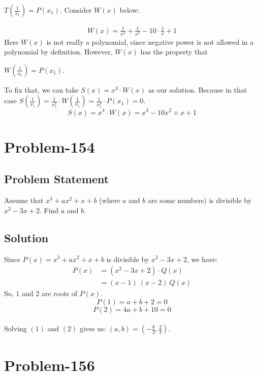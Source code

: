 \documentclass[12pt]{article}
\begin{document}
$T\left( \frac{1}{x_1} \right) = P(x_1)$. Consider $W(x)$ below:

\begin{equation*}
	\begin{aligned}
		W(x) = \frac{1}{x^3} + \frac{1}{x^2} - 10 \cdot \frac{1}{x} + 1
	\end{aligned}
\end{equation*}
Here $W(x)$ is not really a polynomial, since negative power is not allowed in a polynomial by definition. However, $W(x)$ has the property that 

$W\left( \frac{1}{x_1} \right) = P(x_1)$.

To fix that, we can take $S(x) = x^3 \cdot W(x)$ as our solution. Because in that case $S\left( \frac{1}{x_1} \right) = \frac{1}{x_1^3} \cdot W\left( \frac{1}{x_1} \right) = \frac{1}{x_1^3} \cdot P(x_1) = 0$.
\[
	S(x) = x^3 \cdot W(x) = x^3 - 10x^2 + x + 1
\]

\section*{Problem-154}
\subsection*{Problem Statement}
Assume that $x^3 + ax^2 + x + b$ (where $a$ and $b$ are some numbers) is divisible by $x^2-3x+2$. Find $a$ and $b$.

\subsection*{Solution}
Since $P(x) = x^3 + ax^2 + x + b$ is divisible by $x^2-3x+2$, we have:
\begin{equation*}
	\begin{aligned}
		P(x) &= \left( x^2-3x+2 \right) \cdot Q(x)\\
						   &= (x-1) \ (x-2) \ Q(x)
	\end{aligned}
\end{equation*}
So, $1$ and $2$ are roots of $P(x)$.
\begin{equation}
	P(1) = a+b+2 = 0
\end{equation}
\begin{equation}
	P(2) = 4a + b + 10 = 0
\end{equation}
\\
Solving $(1)$ and $(2)$ gives us: $(a, b) = \left( -\frac{8}{3}, \frac{2}{3} \right)$.

\section*{Problem-156}
\end{document}
